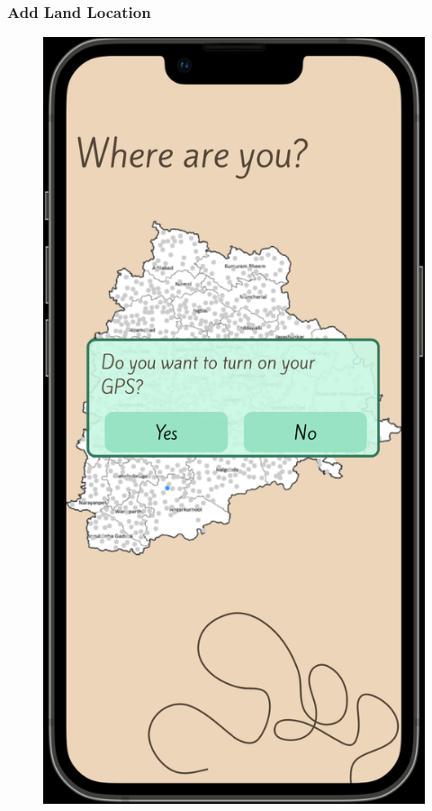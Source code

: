 \subsubsection{Add Land Location}
    \begin{figure}[ht]
        \centering
        \includegraphics[width = 0.5\linewidth]{figures/addland1.png}
        \label{fig:profile}
    \end{figure}
\clearpage

